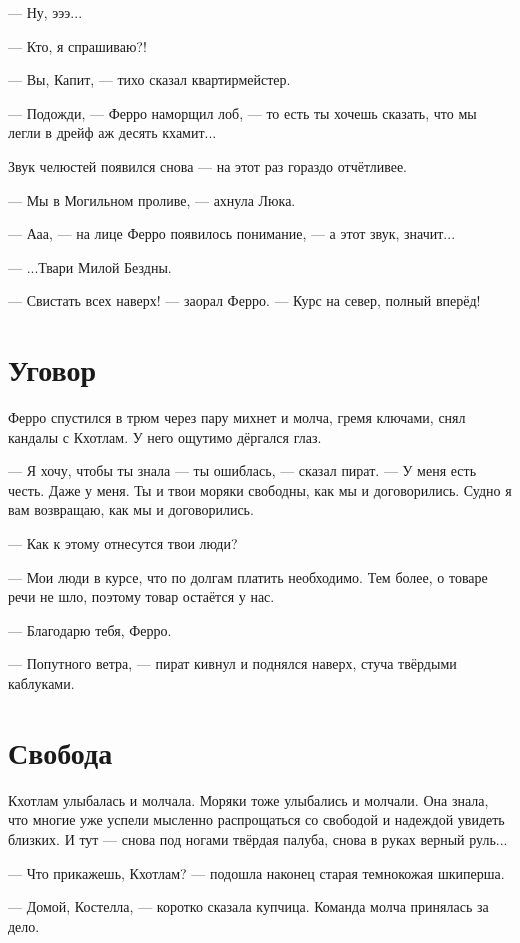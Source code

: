 --- Ну, эээ...

--- Кто, я спрашиваю?!

--- Вы, Капит, --- тихо сказал квартирмейстер.

--- Подожди, --- Ферро наморщил лоб, --- то есть ты хочешь сказать, что мы легли в дрейф аж десять кхамит...

Звук челюстей появился снова --- на этот раз гораздо отчётливее.

--- Мы в Могильном проливе, --- ахнула Люка.

--- Ааа, --- на лице Ферро появилось понимание, --- а этот звук, значит...

--- ...Твари Милой Бездны.

--- Свистать всех наверх! --- заорал Ферро.
--- Курс на север, полный вперёд!

\section{Уговор}

Ферро спустился в трюм через пару михнет и молча, гремя ключами, снял кандалы с Кхотлам.
У него ощутимо дёргался глаз.

--- Я хочу, чтобы ты знала --- ты ошиблась, --- сказал пират.
--- У меня есть честь.
Даже у меня.
Ты и твои моряки свободны, как мы и договорились.
Судно я вам возвращаю, как мы и договорились.

--- Как к этому отнесутся твои люди?

--- Мои люди в курсе, что по долгам платить необходимо.
Тем более, о товаре речи не шло, поэтому товар остаётся у нас.

--- Благодарю тебя, Ферро.

--- Попутного ветра, --- пират кивнул и поднялся наверх, стуча твёрдыми каблуками.

\section{Свобода}

Кхотлам улыбалась и молчала.
Моряки тоже улыбались и молчали.
Она знала, что многие уже успели мысленно распрощаться со свободой и надеждой увидеть близких.
И тут --- снова под ногами твёрдая палуба, снова в руках верный руль...

--- Что прикажешь, Кхотлам? --- подошла наконец старая темнокожая шкиперша.

--- Домой, Костелла, --- коротко сказала купчица.
Команда молча принялась за дело.

